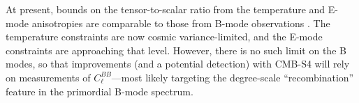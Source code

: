 At present, bounds on the tensor-to-scalar ratio from the temperature and E-mode anisotropies are comparable to those from B-mode observations \cite{Ade:2013uln,Ade:2015lrj}. The temperature constraints are now cosmic variance-limited, and the E-mode constraints are approaching that level.  However, there is no such limit on the B modes, so that improvements (and a potential detection) with CMB-S4 will rely on measurements of $C_\ell^{BB}$---most likely targeting the degree-scale ``recombination'' feature in the primordial B-mode spectrum. 




